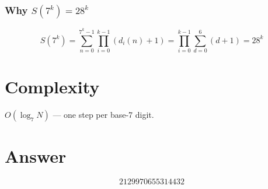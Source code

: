 \documentclass[12pt]{article}
\theoremstyle{definition}
\begin{document}
\subsubsection{Why $S(7^k) = 28^k$}
\[
S(7^k) = \sum_{n=0}^{7^k-1} \prod_{i=0}^{k-1}(d_i(n)+1) = \prod_{i=0}^{k-1} \sum_{d=0}^{6}(d+1) = 28^k
\]

\section{Complexity}
$O(\log_7 N)$ --- one step per base-7 digit.

\section{Answer}

\[
\boxed{2129970655314432}
\]
\end{document}
